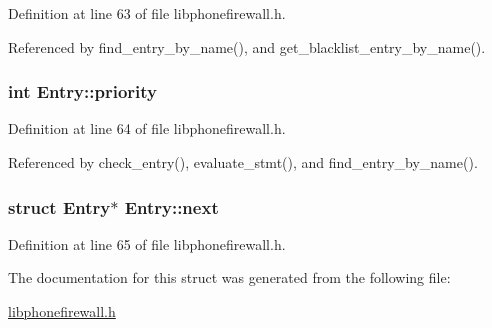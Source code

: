 Definition at line 63 of file libphonefirewall.h.

Referenced by find\_\-entry\_\-by\_\-name(), and get\_\-blacklist\_\-entry\_\-by\_\-name().\hypertarget{structEntry_85af261b3171c257892b54a7200da061}{
\subsubsection{\setlength{\rightskip}{0pt plus 5cm}int {\bf Entry::priority}}}
\label{structEntry_85af261b3171c257892b54a7200da061}




Definition at line 64 of file libphonefirewall.h.

Referenced by check\_\-entry(), evaluate\_\-stmt(), and find\_\-entry\_\-by\_\-name().\hypertarget{structEntry_08cba741f383cd7da0f3ab9aee6e3cd5}{
\subsubsection{\setlength{\rightskip}{0pt plus 5cm}struct {\bf Entry}$\ast$ {\bf Entry::next}}}
\label{structEntry_08cba741f383cd7da0f3ab9aee6e3cd5}




Definition at line 65 of file libphonefirewall.h.

The documentation for this struct was generated from the following file:\begin{CompactItemize}
\item 
\hyperlink{libphonefirewall_8h}{libphonefirewall.h}\end{CompactItemize}
